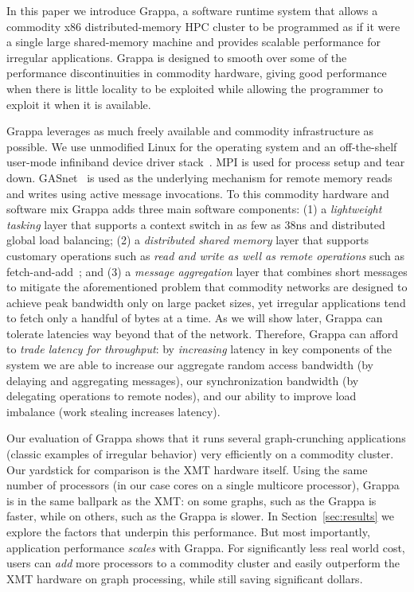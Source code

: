 In this paper we introduce Grappa, a software runtime system that allows
a commodity x86 distributed-memory HPC cluster to be programmed as if it
were a single large shared-memory machine and provides scalable
performance for irregular applications. Grappa is designed to smooth
over some of the performance discontinuities in commodity hardware,
giving good performance when there is little locality to be exploited
while allowing the programmer to exploit it when it is available. 

Grappa leverages as much freely available and commodity infrastructure as
possible. We use unmodified Linux for the operating system and an
off-the-shelf user-mode infiniband device driver stack~\cite{OFED}. MPI is
used for process setup and tear down. GASnet~\cite{gasnet:spec} is used as the
underlying mechanism for remote memory reads and writes using active message
invocations. To this commodity hardware and software mix Grappa adds three
main software components: (1) a \emph{lightweight tasking} layer that supports
a context switch in as few as 38ns and distributed global load balancing; (2)
a \emph{distributed shared memory} layer that supports customary operations
such as \emph{read and write as well as remote operations} such as
fetch-and-add~\cite{fetchandadd}; and (3) a \emph{message aggregation} layer
that combines short messages to mitigate the aforementioned problem that
commodity networks are designed to achieve peak bandwidth only on large packet
sizes, yet irregular applications tend to fetch only a handful of bytes at a
time. As we will show later, Grappa can tolerate latencies way beyond that of
the network. Therefore, Grappa can afford to \emph{trade latency for
throughput}: by {\em increasing} latency in key components of the system we
are able to increase our aggregate random access bandwidth (by delaying and
aggregating messages), our synchronization bandwidth (by delegating operations
to remote nodes), and our ability to improve load imbalance (work stealing
increases latency).

% 
% 

Our evaluation of Grappa shows that it runs several graph-crunching
applications (classic examples of irregular behavior) very efficiently on a
commodity cluster. Our yardstick for comparison is the XMT hardware itself.
Using the same number of processors (in our case cores on a single multicore
processor), Grappa is in the same ballpark as the XMT: on some graphs, such as
the  Grappa is  faster, while on others, such as the
 Grappa is  slower. In Section~\ref{sec:results} we
explore the factors that underpin this performance. But most importantly,
application performance \emph{scales} with Grappa. For significantly less real
world cost, users can \emph{add} more processors to a commodity cluster and
easily outperform the XMT hardware on graph processing, while still saving
significant dollars.

% 


